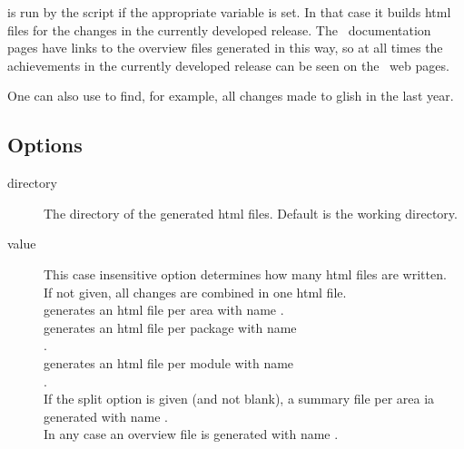  is run by the  script if the
appropriate  variable is set.
In that case it builds html files for the changes in the currently
developed release.
The \aipspp\ documentation pages have links to the overview files
generated in this way, so at all times the achievements in the
currently developed release can be seen on the \aipspp\ web pages.

One can also use  to find, for example, all
changes made to glish in the last year.

\subsection*{Options}

\begin{description}
\item[ directory]
   The directory of the generated html files.
   Default is the working directory.

\item[ value]
   This case insensitive option determines how many html files are written.
   \\If not given, all changes are combined in one html file.
   \\ generates an html file per area
   with name .
   \\ generates an html file per package
   with name
   \\.
   \\ generates an html file per module
   with name
   \\.
   \\If the split option is given (and not blank), a summary
   file per area ia generated with name
   .
   \\In any case an overview file is generated with name
   .


\end{description}

